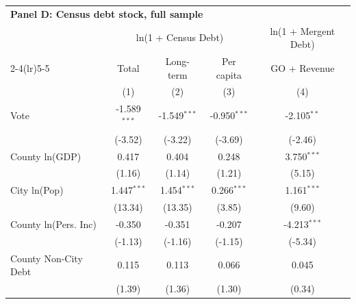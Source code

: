 \begingroup
\centering
\begin{tabular*}{\textwidth}{@{\extracolsep{\fill}}lcccc}
\multicolumn{5}{l}{\textbf{Panel D: Census debt stock, full sample}}\\

\addlinespace
   \toprule
                        & \multicolumn{3}{c}{ln(1 + Census Debt)} & \multicolumn{1}{c}{ln(1 + Mergent Debt)}\\  
   \cmidrule(lr){2-4}\cmidrule(lr){5-5}
                        & Total                     & Long-term                     & Per capita                           & GO + Revenue \\   
                        & (1)                       & (2)                           & (3)                                  & (4)\\  
   \midrule 
   Vote                 & -1.589$^{***}$            & -1.549$^{***}$                & -0.950$^{***}$                       & -2.105$^{**}$\\   
                        & (-3.52)                  & (-3.22)                      & (-3.69)                             & (-2.46)\\   
   County ln(GDP)       & 0.417                     & 0.404                         & 0.248                                & 3.750$^{***}$\\   
                        & (1.16)                   & (1.14)                       & (1.21)                              & (5.15)\\   
   City ln(Pop)         & 1.447$^{***}$             & 1.454$^{***}$                 & 0.266$^{***}$                        & 1.161$^{***}$\\   
                        & (13.34)                  & (13.35)                      & (3.85)                              & (9.60)\\   
   County ln(Pers. Inc) & -0.350                    & -0.351                        & -0.207                               & -4.213$^{***}$\\   
                        & (-1.13)                  & (-1.16)                      & (-1.15)                             & (-5.34)\\   
   County Non-City Debt & 0.115                     & 0.113                         & 0.066                                & 0.045\\   
                        & (1.39)                   & (1.36)                       & (1.30)                              & (0.34)\\   

\end{tabular*}
